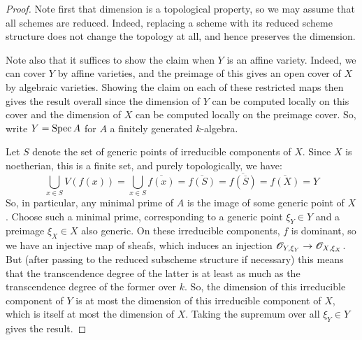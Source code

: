 \begin{proof}
	Note first that dimension is a topological property, so we may assume that all schemes are reduced. Indeed, replacing a scheme with its reduced scheme structure does not change the topology at all, and hence preserves the dimension.
	
	Note also that it suffices to show the claim when $Y$ is an affine variety. Indeed, we can cover $Y$ by affine varieties, and the preimage of this gives an open cover of $X$ by algebraic varieties. Showing the claim on each of these restricted maps then gives the result overall since the dimension of $Y$ can be computed locally on this cover and the dimension of $X$ can be computed locally on the preimage cover. So, write $Y = \operatorname{Spec} A$ for $A$ a finitely generated $k$-algebra.
	
	Let $S$ denote the set of generic points of irreducible components of $X$. Since $X$ is noetherian, this is a finite set, and purely topologically, we have:
	\[ \bigcup_{x \in S} V(f(x)) = \bigcup_{x \in S} \overline{f(x)} = \overline{f(S)} = \overline{f(\overline{S})} = \overline{f(X)} = Y \]
	So, in particular, any minimal prime of $A$ is the image of some generic point of $X$. Choose such a minimal prime, corresponding to a generic point $\xi_Y \in Y$ and a preimage $\xi_X \in X$ also generic. On these irreducible components, $f$ is dominant, so we have an injective map of sheafs, which induces an injection $\mathscr{O}_{Y,\xi_Y} \to \mathscr{O}_{X,\xi_X}$. But (after passing to the reduced subscheme structure if necessary) this means that the transcendence degree of the latter is at least as much as the transcendence degree of the former over $k$. So, the dimension of this irreducible component of $Y$ is at most the dimension of this irreducible component of $X$, which is itself at most the dimension of $X$. Taking the supremum over all $\xi_Y \in Y$ gives the result.
\end{proof}
